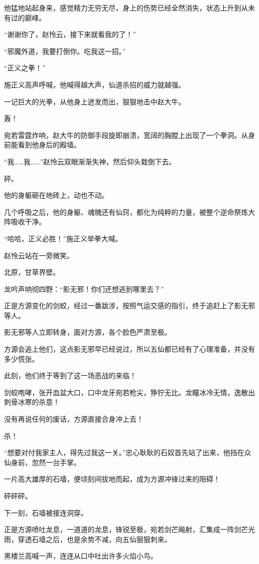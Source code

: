 \begin{this_body}
他猛地站起身来，感觉精力无穷无尽，身上的伤势已经全然消失，状态上升到从未有过的巅峰。

“谢谢你了，赵怜云，接下来就看我的了！”

“邪魔外道，我要打倒你。吃我这一招。”

“正义之拳！”

施正义高声呼喊，他喊得越大声，仙道杀招的威力就越强。

一记巨大的光拳，从他身上迸发而出，狠狠地击中赵大牛。

轰！

宛若雷霆炸响，赵大牛的防御手段旋即崩溃，宽阔的胸膛上出现了一个拳洞。从身前能看到他身后的殿墙。

“我……我……”赵怜云双眼渐渐失神，然后仰头栽倒下去。

砰。

他的身躯砸在地砖上，动也不动。

几个呼吸之后，他的身躯、魂魄还有仙窍，都化为纯粹的力量，被整个逆命祭炼大阵吸收干净。

“哈哈，正义必胜！”施正义举拳大喊。

赵怜云站在一旁微笑。

北原，甘草界壁。

龙吟声响彻四野：“影无邪！你们还想逃到哪里去？”

正是方源变化的剑蛟，经过一番跋涉，按照气运交感的指引，终于追赶上了影无邪等人。

影无邪等人立即转身，面对方源，各个脸色严肃至极。

方源会追上他们，这点影无邪早已经说过，所以五仙都已经有了心理准备，并没有多少慌张。

此刻，他们终于等到了这一场恶战的来临！

剑蛟咆哮，张开血盆大口，口中龙牙宛若枪尖，狰狞无比。龙瞳冰冷无情，逸散出刺骨冰寒的杀意！

没有再说任何的废话，方源直接合身冲上去！

杀！

“想要对付我家主人，得先过我这一关。”忠心耿耿的石奴首先站了出来，他挡在众仙身前，忽然一台手掌。

一片高大雄厚的石墙，便顷刻间拔地而起，成为方源冲锋过来的阻碍！

砰砰砰。

下一刻，石墙被接连洞穿。

正是方源喷吐龙息，一道道的龙息，锋锐至极，宛若剑芒飚射，汇集成一阵剑芒光雨，穿透石墙之后，也是余势不减，向五仙狠狠刺来。

黑楼兰高喊一声，连连从口中吐出许多火焰小鸟。


\end{this_body}
